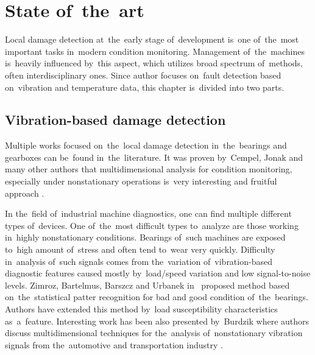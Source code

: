 \chapter{State of~the~art}

Local damage detection at~the~early stage of~development is~one of~the~most important tasks in~modern condition monitoring. Management of~the~machines is~heavily influenced by~this aspect, which utilizes broad spectrum of~methods, often interdisciplinary ones. Since author focuses on~fault detection based on~vibration and temperature data, this chapter is~divided into two parts.

\section{Vibration-based damage detection}
Multiple works focused on~the~local damage detection in~the~bearings and gearboxes can be~found in~the~literature. It was proven by~Cempel, Jonak and many other authors that multidimensional analysis for condition monitoring, especially under nonstationary operations is~very interesting and fruitful approach \cite{cempel2007multidimensional,zimroz2013two,bartkowiak2014dimensionality,zimroz2014diagnostics,jedlinski2015early,jedlinski2017disassembly}. 

In the~field of~industrial machine diagnostics, one can find multiple different types of~devices. One of~the~most difficult types to~analyze are those working in~highly nonstationary conditions. Bearings of~such machines are exposed to~high amount of~stress and often tend to~wear very quickly. Difficulty in~analysis of~such signals comes from the~variation of~vibration-based diagnostic features caused mostly by~load/speed variation and low signal-to-noise levels. Zimroz, Bartelmus, Barszcz and Urbanek in~\cite{zim_barszcz_mssp} proposed method based on~the~statistical patter recognition for bad and good condition of~the~bearings. Authors have extended this method by~load susceptibility characteristics as~a~feature. Interesting work has been also presented by~Burdzik where authors discuss multidimensional techniques for the~analysis of~nonstationary vibration signals from the~automotive and transportation industry \cite{burdzik2019multidimensional,burdzik2018application,burdzik2013research}.

